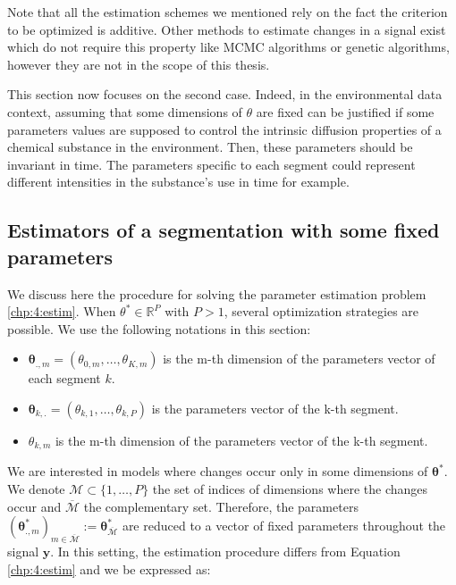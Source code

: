 Note that all the estimation schemes we mentioned rely on the fact the criterion to be optimized is additive. Other methods to estimate changes in a signal exist which do not require this property like MCMC algorithms \citep{Lavielle2001} or genetic algorithms, however they are not in the scope of this thesis.  

This section now focuses on the second case. Indeed, in the environmental data context, assuming that some dimensions of $\theta$ are fixed can be justified if some parameters values are supposed to control the intrinsic diffusion properties of a chemical substance in the environment. Then, these parameters should be invariant in time. The parameters specific to each segment could represent different intensities in the substance's use in time for example. 

\subsection{Estimators of a segmentation with some fixed parameters}

We discuss here the procedure for solving the parameter estimation problem \eqref{chp:4:estim}. When $\theta^* \in \mathbb{R}^P$ with $P > 1$, several optimization strategies are possible. We use the following notations in this section: 
\begin{itemize}
\item $\bm \theta_{.,m} = (\theta_{0,m},\dots,\theta_{K,m})$ is the m-th dimension of the parameters vector of each segment $k$.
\item $\bm \theta_{k,.} = (\theta_{k,1},\dots,\theta_{k,P})$ is the parameters vector of the k-th segment.
\item $\theta_{k,m}$ is the m-th dimension of the parameters vector of the k-th segment.
\end{itemize}

We are interested in models where changes occur only in some dimensions of $\bm\theta^*$. We denote $\mathcal{M} \subset \{1,\dots,P\}$ the set of indices of dimensions where the changes occur and $\overline{\mathcal{M}}$ the complementary set. Therefore, the parameters $(\bm\theta^*_{.,m})_{m \in \overline{\mathcal{M}}} := \bm\theta^*_{\overline{\mathcal{M}}}$ are reduced to a vector of fixed parameters throughout the signal $\bm y$. In this setting, the estimation procedure differs from Equation \eqref{chp:4:estim} and we be expressed as: 


